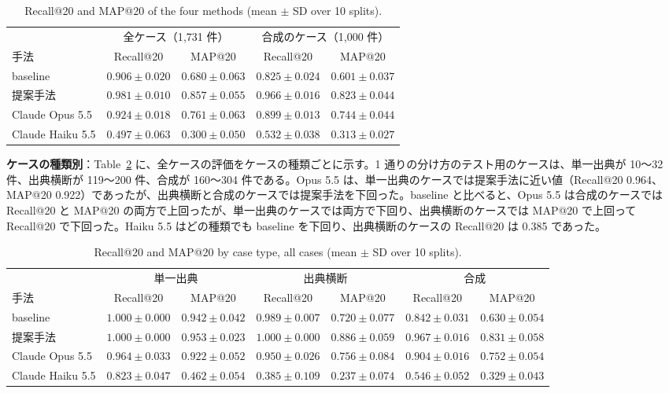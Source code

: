 \documentclass[a4j,dvipdfmx,10pt]{jresume}
\begin{document}
\begin{table}[t]\centering
\footnotesize
\caption{Recall@20 and MAP@20 of the four methods (mean $\pm$ SD over 10 splits).}
\label{tab:results}
\begin{tabular}{@{}lcccc@{}}
\toprule
 & \multicolumn{2}{c}{全ケース（1{,}731 件）} & \multicolumn{2}{c}{合成のケース（1{,}000 件）} \\
\cmidrule(lr){2-3}\cmidrule(l){4-5}
手法 & Recall@20 & MAP@20 & Recall@20 & MAP@20 \\
\midrule
baseline & $0.906 \pm 0.020$ & $0.680 \pm 0.063$ & $0.825 \pm 0.024$ & $0.601 \pm 0.037$ \\
提案手法 & $0.981 \pm 0.010$ & $0.857 \pm 0.055$ & $0.966 \pm 0.016$ & $0.823 \pm 0.044$ \\
Claude Opus 5.5 & $0.924 \pm 0.018$ & $0.761 \pm 0.063$ & $0.899 \pm 0.013$ & $0.744 \pm 0.044$ \\
Claude Haiku 5.5 & $0.497 \pm 0.063$ & $0.300 \pm 0.050$ & $0.532 \pm 0.038$ & $0.313 \pm 0.027$ \\
\bottomrule
\end{tabular}
\end{table}

\textbf{ケースの種類別}：Table~\ref{tab:kind} に、全ケースの評価をケースの種類ごとに示す。1 通りの分け方のテスト用のケースは、単一出典が 10〜32 件、出典横断が 119〜200 件、合成が 160〜304 件である。Opus 5.5 は、単一出典のケースでは提案手法に近い値（Recall@20 0.964、MAP@20 0.922）であったが、出典横断と合成のケースでは提案手法を下回った。baseline と比べると、Opus 5.5 は合成のケースでは Recall@20 と MAP@20 の両方で上回ったが、単一出典のケースでは両方で下回り、出典横断のケースでは MAP@20 で上回って Recall@20 で下回った。Haiku 5.5 はどの種類でも baseline を下回り、出典横断のケースの Recall@20 は 0.385 であった。

\begin{table}[t]\centering
\footnotesize
\caption{Recall@20 and MAP@20 by case type, all cases (mean $\pm$ SD over 10 splits).}
\label{tab:kind}
\setlength{\tabcolsep}{4pt}
\begin{tabular}{@{}lcccccc@{}}
\toprule
 & \multicolumn{2}{c}{単一出典} & \multicolumn{2}{c}{出典横断} & \multicolumn{2}{c}{合成} \\
\cmidrule(lr){2-3}\cmidrule(lr){4-5}\cmidrule(l){6-7}
手法 & Recall@20 & MAP@20 & Recall@20 & MAP@20 & Recall@20 & MAP@20 \\
\midrule
baseline & $1.000 \pm 0.000$ & $0.942 \pm 0.042$ & $0.989 \pm 0.007$ & $0.720 \pm 0.077$ & $0.842 \pm 0.031$ & $0.630 \pm 0.054$ \\
提案手法 & $1.000 \pm 0.000$ & $0.953 \pm 0.023$ & $1.000 \pm 0.000$ & $0.886 \pm 0.059$ & $0.967 \pm 0.016$ & $0.831 \pm 0.058$ \\
Claude Opus 5.5 & $0.964 \pm 0.033$ & $0.922 \pm 0.052$ & $0.950 \pm 0.026$ & $0.756 \pm 0.084$ & $0.904 \pm 0.016$ & $0.752 \pm 0.054$ \\
Claude Haiku 5.5 & $0.823 \pm 0.047$ & $0.462 \pm 0.054$ & $0.385 \pm 0.109$ & $0.237 \pm 0.074$ & $0.546 \pm 0.052$ & $0.329 \pm 0.043$ \\
\bottomrule
\end{tabular}
\end{table}
\end{document}
